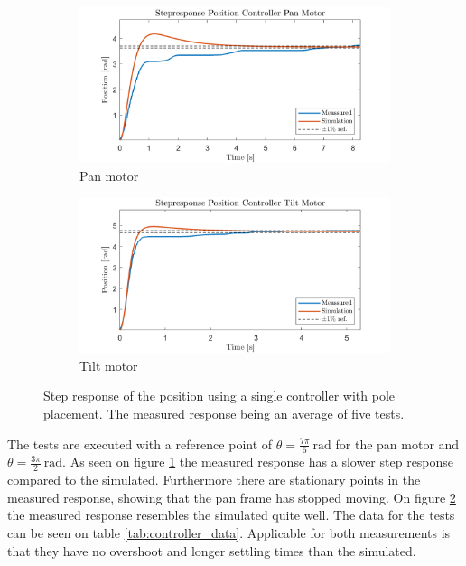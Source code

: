 \documentclass[../../main.tex]{subfiles}
\begin{document}
\begin{figure}[h]
     \centering
     \begin{subfigure}[b]{0.49\textwidth}
         \centering
         \includegraphics[width=\textwidth]{Sections/Test/Images/StepPanPosModel.png}
         \caption{Pan motor}
         \label{fig:StepPanPos}
     \end{subfigure}
     \hfill
     \begin{subfigure}[b]{0.49\textwidth}
         \centering
         \includegraphics[width=\textwidth]{Sections/Test/Images/StepTiltPosModel.png}
         \caption{Tilt motor}
         \label{fig:StepTiltPos}
     \end{subfigure}
        \caption{Step response of the position using a single controller with pole placement. The measured response being an average of five tests.}
        \label{fig:singlePosController}
\end{figure}
The tests are executed with a reference point of $\theta = \frac{7\pi}{6}\SI{}{\radian}$ for the pan motor and $\theta = \frac{3\pi}{2}\SI{}{\radian}$. As seen on figure \ref{fig:StepPanPos} the measured response has a slower step response compared to the simulated. Furthermore there are stationary points in the measured response, showing that the pan frame has stopped moving. On figure \ref{fig:StepTiltPos} the measured response resembles the simulated quite well. The data for the tests can be seen on table \ref{tab:controller_data}. Applicable for both measurements is that they have no overshoot and longer settling times than the simulated. 
\end{document}
